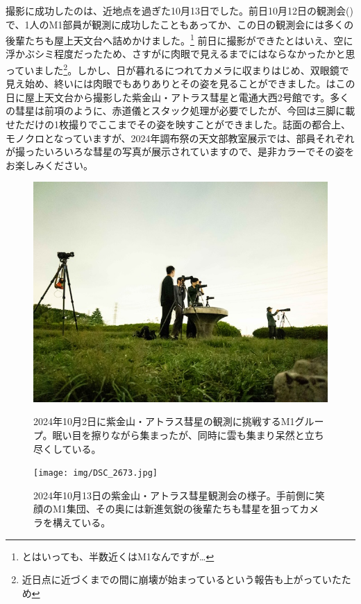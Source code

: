 \documentclass[../../super_nova_2024]{subfiles}
\begin{document}
撮影に成功したのは、近地点を過ぎた10月13日でした。前日10月12日の観測会()で、1人のM1部員が観測に成功したこともあってか、この日の観測会には多くの後輩たちも屋上天文台へ詰めかけました。\footnote{とはいっても、半数近くはM1なんですが…} 前日に撮影ができたとはいえ、空に浮かぶシミ程度だったため、さすがに肉眼で見えるまでにはならなかったかと思っていました\footnote{近日点に近づくまでの間に崩壊が始まっているという報告も上がっていたため}。しかし、日が暮れるにつれてカメラに収まりはじめ、双眼鏡で見え始め、終いには肉眼でもありありとその姿を見ることができました。はこの日に屋上天文台から撮影した紫金山・アトラス彗星と電通大西2号館です。多くの彗星は前項のように、赤道儀とスタック処理が必要でしたが、今回は三脚に載せただけの1枚撮りでここまでその姿を映すことができました。誌面の都合上、モノクロとなっていますが、2024年調布祭の天文部教室展示では、部員それぞれが撮ったいろいろな彗星の写真が展示されていますので、是非カラーでその姿をお楽しみください。
\begin{figure}[H]
  \centering
  \begin{minipage}{0.49\columnwidth}
    \centering
    \includegraphics[width=\textwidth]{img/20241002_044541.jpg}
    \caption{2024年10月2日に紫金山・アトラス彗星の観測に挑戦するM1グループ。眠い目を擦りながら集まったが、同時に雲も集まり呆然と立ち尽くしている。}
    \label{fig:1002}
  \end{minipage}
  \begin{minipage}{0.49\columnwidth}
    \centering
    \texttt{[image: img/DSC\_2673.jpg]}
    \caption{2024年10月13日の紫金山・アトラス彗星観測会の様子。手前側に笑顔のM1集団、その奥には新進気鋭の後輩たちも彗星を狙ってカメラを構えている。}
    \label{fig:1013}
    \end{minipage}
\end{figure}
\end{document}
